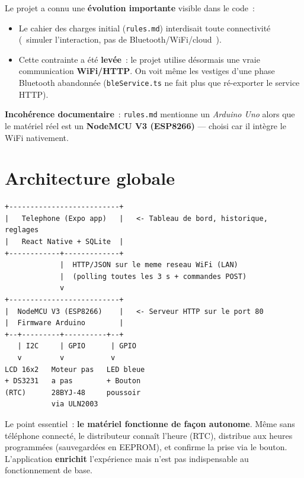 \documentclass[11pt,a4paper]{article}
\begin{document}
Le projet a connu une \textbf{\'evolution importante} visible dans le code~:
\begin{itemize}
  \item Le cahier des charges initial (\texttt{rules.md}) interdisait toute
        connectivit\'e (\guillemotleft~simuler l'interaction, pas de
        Bluetooth/WiFi/cloud~\guillemotright).
  \item Cette contrainte a \'et\'e \textbf{lev\'ee}~: le projet utilise d\'esormais une
        vraie communication \textbf{WiFi/HTTP}. On voit m\^eme les vestiges d'une phase
        Bluetooth abandonn\'ee (\texttt{bleService.ts} ne fait plus que r\'e-exporter le
        service HTTP).
\end{itemize}

\begin{warnbox}
\textbf{Incoh\'erence documentaire}~: \texttt{rules.md} mentionne un \emph{Arduino Uno}
alors que le mat\'eriel r\'eel est un \textbf{NodeMCU V3 (ESP8266)} --- choisi car il
int\`egre le WiFi nativement.
\end{warnbox}

\section{Architecture globale}

\begin{lstlisting}
+--------------------------+
|   Telephone (Expo app)   |   <- Tableau de bord, historique, reglages
|   React Native + SQLite  |
+------------+-------------+
             |  HTTP/JSON sur le meme reseau WiFi (LAN)
             |  (polling toutes les 3 s + commandes POST)
             v
+--------------------------+
|  NodeMCU V3 (ESP8266)    |   <- Serveur HTTP sur le port 80
|  Firmware Arduino        |
+--+---------+----------+--+
   | I2C     | GPIO      | GPIO
   v         v           v
LCD 16x2   Moteur pas   LED bleue
+ DS3231   a pas        + Bouton
(RTC)      28BYJ-48     poussoir
           via ULN2003
\end{lstlisting}

Le point essentiel~: \textbf{le mat\'eriel fonctionne de fa\c con autonome}. M\^eme sans
t\'el\'ephone connect\'e, le distributeur conna\^it l'heure (RTC), distribue aux heures
programm\'ees (sauvegard\'ees en EEPROM), et confirme la prise via le bouton.
L'application \textbf{enrichit} l'exp\'erience mais n'est pas indispensable au
fonctionnement de base.
\end{document}
